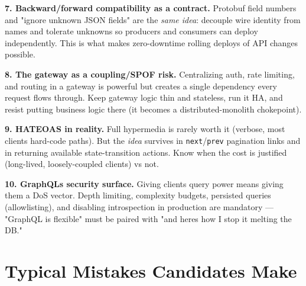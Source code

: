 \documentclass[11pt]{article}
\begin{document}
\textbf{7. Backward/forward compatibility as a contract.} Protobuf field numbers and "ignore unknown JSON fields" are the \emph{same idea}: decouple wire identity from names and tolerate unknowns so producers and consumers can deploy independently. This is what makes zero-downtime rolling deploys of API changes possible.

\textbf{8. The gateway as a coupling/SPOF risk.} Centralizing auth, rate limiting, and routing in a gateway is powerful but creates a single dependency every request flows through. Keep gateway logic thin and stateless, run it HA, and resist putting business logic there (it becomes a distributed-monolith chokepoint).

\textbf{9. HATEOAS in reality.} Full hypermedia is rarely worth it (verbose, most clients hard-code paths). But the \emph{idea} survives in \texttt{next}/\texttt{prev} pagination links and in returning available state-transition actions. Know when the cost is justified (long-lived, loosely-coupled clients) vs not.

\textbf{10. GraphQL\textquotesingle s security surface.} Giving clients query power means giving them a DoS vector. Depth limiting, complexity budgets, persisted queries (allowlisting), and disabling introspection in production are mandatory --- "GraphQL is flexible" must be paired with "and here\textquotesingle s how I stop it melting the DB."

\section{Typical Mistakes Candidates Make}\label{typical-mistakes-candidates-make}
\end{document}
